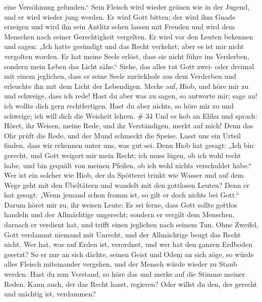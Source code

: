 eine Versöhnung gefunden.``  Sein Fleisch wird wieder
grünen wie in der Jugend, und er wird wieder jung werden. 
Er wird Gott bitten; der wird ihm Gnade erzeigen und wird ihn sein
Antlitz sehen lassen mit Freuden und wird dem Menschen nach seiner
Gerechtigkeit vergelten.  Er wird vor den Leuten bekennen
und sagen: „Ich hatte gesündigt und das Recht verkehrt; aber es ist mir
nicht vergolten worden.  Er hat meine Seele erlöst, dass
sie nicht führe ins Verderben, sondern mein Leben das Licht sähe.``
 Siehe, das alles tut Gott zwei- oder dreimal mit einem
jeglichen,  dass er seine Seele zurückhole aus dem
Verderben und erleuchte ihn mit dem Licht der Lebendigen. 
Merke auf, Hiob, und höre mir zu und schweige, dass ich rede!
 Hast du aber was zu sagen, so antworte mir; sage an! ich
wollte dich gern rechtfertigen.  Hast du aber nichts, so
höre mir zu und schweige; ich will dich die Weisheit lehren. \# 34
 Und es hob an Elihu und sprach:  Höret, ihr
Weisen, meine Rede, und ihr Verständigen, merkt auf mich! 
Denn das Ohr prüft die Rede, und der Mund schmeckt die Speise.
 Lasst uns ein Urteil finden, dass wir erkennen unter uns,
was gut sei.  Denn Hiob hat gesagt: „Ich bin gerecht, und
Gott weigert mir mein Recht;  ich muss lügen, ob ich wohl
recht habe, und bin gequält von meinen Pfeilen, ob ich wohl nichts
verschuldet habe.``  Wer ist ein solcher wie Hiob, der da
Spötterei trinkt wie Wasser  und auf dem Wege geht mit den
Übeltätern und wandelt mit den gottlosen Leuten?  Denn er
hat gesagt: „Wenn jemand schon fromm ist, so gilt er doch nichts bei
Gott.``  Darum höret mir zu, ihr weisen Leute: Es sei
ferne, dass Gott sollte gottlos handeln und der Allmächtige ungerecht;
 sondern er vergilt dem Menschen, darnach er verdient hat,
und trifft einen jeglichen nach seinem Tun.  Ohne Zweifel,
Gott verdammt niemand mit Unrecht, und der Allmächtige beugt das Recht
nicht.  Wer hat, was auf Erden ist, verordnet, und wer hat
den ganzen Erdboden gesetzt?  So er nur an sich dächte,
seinen Geist und Odem an sich zöge,  so würde alles Fleisch
miteinander vergehen, und der Mensch würde wieder zu Staub werden.
 Hast du nun Verstand, so höre das und merke auf die Stimme
meiner Reden.  Kann auch, der das Recht hasst, regieren?
Oder willst du den, der gerecht und mächtig ist, verdammen?
